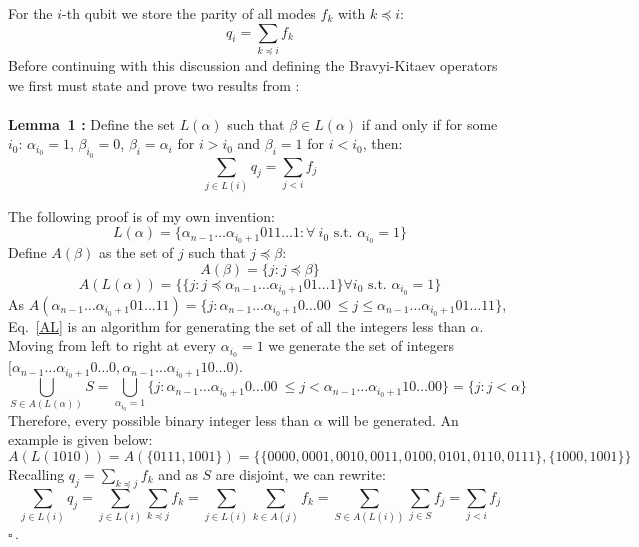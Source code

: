 \documentclass[twoside]{article}
\begin{document}
For the $i$-th qubit we store the parity of all modes $f_k$ with $k \preceq i$:
\begin{equation}
        q_i = \sum_{k \preceq i} f_k 
\end{equation}
Before continuing with this discussion and defining the Bravyi-Kitaev operators we first must state and prove two results from \cite{bravyikitaev}:\\\\
{\bf Lemma~1 \cite{bravyikitaev}:} Define the set $L(\alpha)$ such that $\beta \in L(\alpha)$ if and only if for some $i_0$: $\alpha_{i_0} = 1$, $\beta_{i_0} = 0$, $\beta_i = \alpha_i$ for $i> i_0$ and $\beta_i = 1$ for $i< i_0$, then:
\begin{equation}
        \sum_{j \in L(i)} q_j = \sum_{j < i} f_j
\end{equation}
\vspace*{12pt}

\noindent
The following proof is of my own invention:
\begin{equation}
L(\alpha) = \{ \alpha_{n-1} \ldots \alpha_{i_0 +1} 0 11 \ldots 1: \forall \>i_0\text{ s.t. } \alpha_{i_0} = 1\}
\end{equation}
Define $A(\beta)$ as the set of $j$ such that $j \preceq \beta$:
\begin{equation}
        A(\beta) = \{j: j \preceq \beta\} 
\end{equation}
\begin{equation}
        \label{AL}
A(L(\alpha)) =  \{\{  j: j \preceq \alpha_{n-1} \ldots \alpha_{i_0+1}0 1 \ldots 1 \} \forall i_0 \text{ s.t. } \alpha_{i_0} = 1 \}
\end{equation}
As $A(\alpha_{n-1}\ldots\alpha_{i_0+1}01\ldots11) =  \{j:\alpha_{n-1}\ldots \alpha_{i_0+1} 0\ldots 00\ \leq j \leq \alpha_{n-1}\ldots \alpha_{i_0+1} 01\ldots 11\}$, Eq.~\ref{AL} is an algorithm for generating the set of all the integers less than $\alpha$. Moving from left to right at every $\alpha_{i_0}= 1$ we generate the set of integers $[\alpha_{n-1}\ldots\alpha_{i_0+1} 0\ldots0, \alpha_{n-1} \ldots \alpha_{i_0+1}10 \ldots 0)$. 
$$\bigcup_{S\in A(L(\alpha))}S = \bigcup_{\alpha_{i_0} = 1} \{j:\alpha_{n-1}\ldots \alpha_{i_0+1} 0\ldots 00\ \leq j < \alpha_{n-1}\ldots \alpha_{i_0+1} 10\ldots 00\} = \{ j: j < \alpha\}$$
Therefore, every possible binary integer less than $\alpha$ will be generated. An example is given below:
$$
A(L(1010)) = A(\{0111, 1001 \}) = \{\{0000, 0001, 0010, 0011, 0100, 0101, 0110, 0111\}, \{1000, 1001\}\}
$$
Recalling $q_j = \sum_{k \preceq j} f_k$ and as $S$ are disjoint, we can rewrite:
\begin{equation}
        \sum_{j \in L(i)} q_j = \sum_{j \in L(i)} \sum_{k \preceq j} f_k = \sum_{j \in L(i)} \sum_{k \in A(j)} f_k = \sum_{S \in A(L(i))} \sum_{j \in S} f_j = \sum_{j<i} f_j
\end{equation}
 $\square$\,.
 
\end{document}
